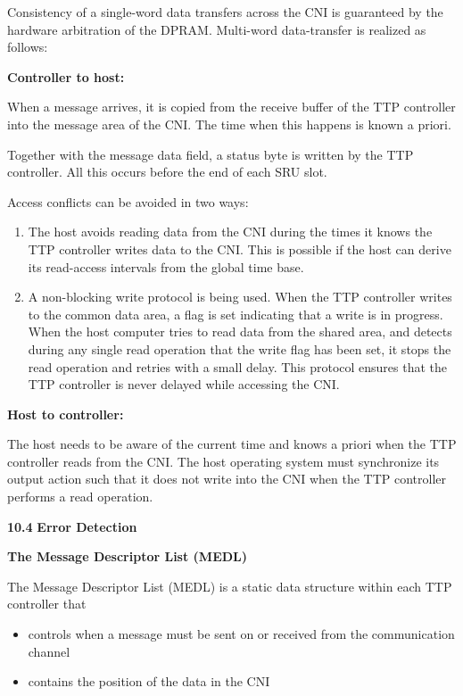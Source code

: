 Consistency of a single-word data transfers across the CNI is guaranteed
by the hardware arbitration of the DPRAM. Multi-word data-transfer is
realized as follows:

\textbf{Controller to host:}

When a message arrives, it is copied from the receive buffer of the TTP
controller into the message area of the CNI. The time when this happens
is known a priori.

Together with the message data field, a status byte is written by the
TTP controller. All this occurs before the end of each SRU slot.

Access conflicts can be avoided in two ways:

\begin{enumerate}
\def\labelenumi{\arabic{enumi}.}
\item
  The host avoids reading data from the CNI during the times it knows
  the TTP controller writes data to the CNI. This is possible if the
  host can derive its read-access intervals from the global time base.
\item
  A non-blocking write protocol is being used. When the TTP controller
  writes to the common data area, a flag is set indicating that a write
  is in progress. When the host computer tries to read data from the
  shared area, and detects during any single read operation that the
  write flag has been set, it stops the read operation and retries with
  a small delay. This protocol ensures that the TTP controller is never
  delayed while accessing the CNI.
\end{enumerate}

\textbf{Host to controller:}

The host needs to be aware of the current time and knows a priori when
the TTP controller reads from the CNI. The host operating system must
synchronize its output action such that it does not write into the CNI
when the TTP controller performs a read operation.

\textbf{10.4} \protect\hypertarget{teil5}{}{}\textbf{Error Detection}

\textbf{The Message Descriptor List (MEDL)}

The Message Descriptor List (MEDL) is a static data structure within
each TTP controller that

\begin{itemize}
\item
  controls when a message must be sent on or received from the
  communication channel
\item
  contains the position of the data in the CNI
\end{itemize}


